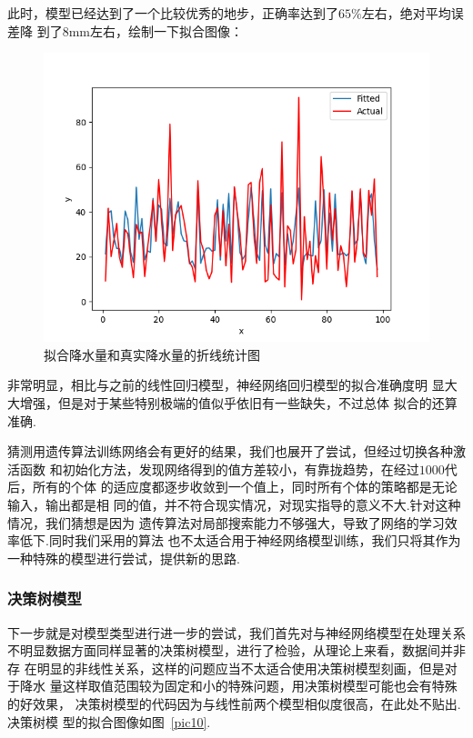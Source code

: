 \documentclass[UTF8, a4paper]{ctexart}
\begin{document}
此时，模型已经达到了一个比较优秀的地步，正确率达到了$65\%$左右，绝对平均误差降
到了$8$\si{\milli\meter}左右，绘制一下拟合图像：

\begin{figure}[h!]
	\centering
	\includegraphics[scale=0.3]{success.png}
	\caption{拟合降水量和真实降水量的折线统计图}
\end{figure}

非常明显，相比与之前的线性回归模型，神经网络回归模型的拟合准确度明
显大大增强，但是对于某些特别极端的值似乎依旧有一些缺失，不过总体
拟合的还算准确.

猜测用遗传算法训练网络会有更好的结果，我们也展开了尝试，但经过切换各种激活函数
和初始化方法，发现网络得到的值方差较小，有靠拢趋势，在经过$1000$代后，所有的个体
的适应度都逐步收敛到一个值上，同时所有个体的策略都是无论输入，输出都是相
同的值，并不符合现实情况，对现实指导的意义不大.针对这种情况，我们猜想是因为
遗传算法对局部搜索能力不够强大，导致了网络的学习效率低下.同时我们采用的算法
也不太适合用于神经网络模型训练，我们只将其作为一种特殊的模型进行尝试，提供新的思路.

\subsubsection{决策树模型}

下一步就是对模型类型进行进一步的尝试，我们首先对与神经网络模型在处理关系
不明显数据方面同样显著的决策树模型，进行了检验，从理论上来看，数据间并非存
在明显的非线性关系，这样的问题应当不太适合使用决策树模型刻画，但是对于降水
量这样取值范围较为固定和小的特殊问题，用决策树模型可能也会有特殊的好效果，
决策树模型的代码因为与线性前两个模型相似度很高，在此处不贴出.决策树模
型的拟合图像如图~\textcolor{red}{\ref{pic10}}.
\end{document}
